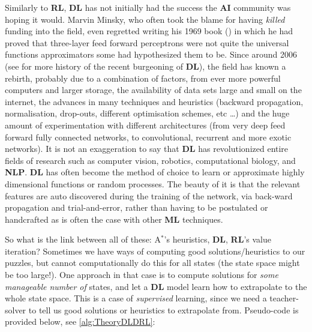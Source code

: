 Similarly to \textbf{RL}, \textbf{DL} has not initially had the success the \textbf{AI} community was hoping it would. Marvin Minsky, who often took the blame for having \textit{killed} funding into the field, even regretted writing his 1969 book (\cite{minskypapert69}) in which he had proved that three-layer feed forward perceptrons were not quite the universal functions approximators some had hypothesized them to be. Since around 2006 (see \cite{GoodBengCour16} for more history of the recent burgeoning of \textbf{DL}), the field has known a rebirth, probably due to a combination of factors, from ever more powerful computers and larger storage, the availability of data sets large and small on the internet, the advances in many techniques and heuristics (backward propagation, normalisation, drop-outs, different optimisation schemes, etc \dots) and the huge amount of experimentation with different architectures (from very deep feed forward fully connected networks, to convolutional, recurrent and more exotic networks). It is not an exaggeration to say that \textbf{DL} has revolutionized entire fields of research such as computer vision, robotics, computational biology, and \textbf{NLP}. \textbf{DL} has often become the method of choice to learn or approximate highly dimensional functions or random processes. The beauty of it is that the relevant features are auto discovered during the training of the network, via back-ward propagation and trial-and-error, rather than having to be postulated or handcrafted as is often the case with other \textbf{ML} techniques.


\label{sec:TheoryDLDRL}
So what is the link between all of these: A$^{*}$'s heuristics, \textbf{DL}, \textbf{RL}'s value iteration? Sometimes we have ways of computing good solutions/heuristics to our puzzles, but cannot computationally do this for all states (the state space might be too large!). One approach in that case is to compute solutions for \textit{some manageable number of} states, and let a \textbf{DL} model learn how to extrapolate to the whole state space. This is a case of \textit{supervised} learning, since we need a teacher-solver to tell us good solutions or heuristics to extrapolate from. Pseudo-code is provided below, see \ref{alg:TheoryDLDRL}:

